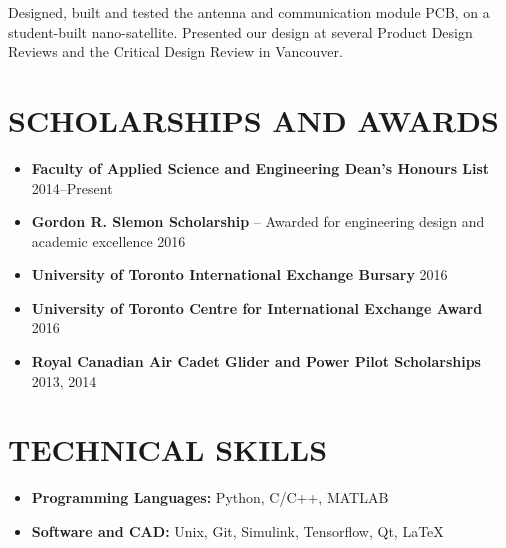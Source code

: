 \documentclass{ResumeTemplate}
\begin{document}
	\workitemstwo
	{Designed, built and tested the antenna and communication module PCB, on a student-built nano-satellite.}
	{Presented our design at several Product Design Reviews and the Critical Design Review in Vancouver.}

	
	\section{SCHOLARSHIPS AND AWARDS}	
	\begin{itemize}[noitemsep, leftmargin=*]
		\item \textbf{Faculty of Applied Science and Engineering Dean's Honours List} \hfill 2014--Present
		\item \textbf{Gordon R. Slemon Scholarship} -- Awarded for engineering design and academic excellence \hfill 2016
		\item \textbf{University of Toronto International Exchange Bursary} \hfill 2016
		\item \textbf{University of Toronto Centre for International Exchange Award} \hfill 2016
		\item \textbf{Royal Canadian Air Cadet Glider and Power Pilot Scholarships} \hfill 2013, 2014\vspace*{-\baselineskip}
	\end{itemize}
	
	\section{TECHNICAL SKILLS}
	\raggedright
	\begin{itemize}[noitemsep, leftmargin=*]
		\item \textbf{Programming Languages:} Python, C/C++,  MATLAB \\
		\item \textbf{Software and CAD:} Unix, Git, Simulink, Tensorflow, Qt, LaTeX\vspace*{-\baselineskip}
	\end{itemize}
\end{document}

